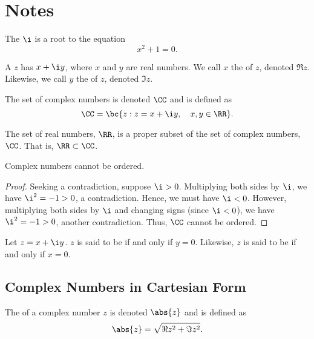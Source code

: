 \section{Notes}

\begin{definition}
    The  $\i$ is a root to the equation \[x^2 + 1 = 0.\]
\end{definition}

\begin{definition}
    A  $z$ has  $x + \i y$, where $x$ and $y$ are real numbers. We call $x$ the  of $z$, denoted $\Re z$. Likewise, we call $y$ the  of $z$, denoted $\Im z$.
\end{definition}

\begin{definition}
    The set of complex numbers is denoted $\CC$ and is defined as \[\CC = \bc{z : z = x + \i y , \quad x, y \in \RR}.\]
\end{definition}
\begin{remark}
    The set of real numbers, $\RR$, is a proper subset of the set of complex numbers, $\CC$. That is, $\RR \subset \CC$.
\end{remark}

\begin{proposition}
    Complex numbers cannot be ordered.
\end{proposition}
\begin{proof}
    Seeking a contradiction, suppose $\i > 0$. Multiplying both sides by $\i$, we have $\i^2 = -1 > 0$, a contradiction. Hence, we must have $\i < 0$. However, multiplying both sides by $\i$ and changing signs (since $\i < 0$), we have $\i^2 = -1 > 0$, another contradiction. Thus, $\CC$ cannot be ordered.
\end{proof}

\begin{definition}
    Let $z = x + \i y$. $z$ is said to be  if and only if $y = 0$. Likewise, $z$ is said to be  if and only if $x = 0$.
\end{definition}

\subsection{Complex Numbers in Cartesian Form}

\begin{definition}
    The  of a complex number $z$ is denoted $\abs{z}$ and is defined as \[\abs{z} = \sqrt{\Re{z}^2 + \Im{z}^2}.\]
\end{definition}

